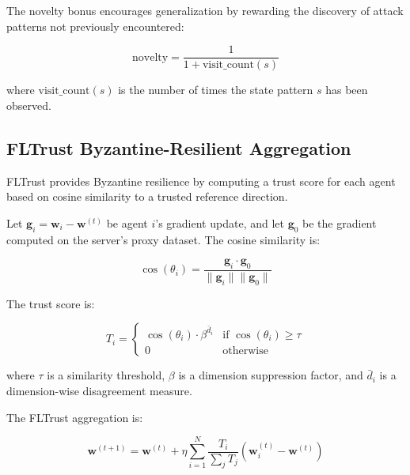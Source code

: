\documentclass[conference]{IEEEtran}
\begin{document}
The novelty bonus encourages generalization by rewarding the discovery of attack patterns not previously encountered:

\begin{equation}
\text{novelty} = \frac{1}{1 + \text{visit\_count}(s)}
\end{equation}

where $\text{visit\_count}(s)$ is the number of times the state pattern $s$ has been observed.

\subsection{FLTrust Byzantine-Resilient Aggregation}

FLTrust \cite{fltrust} provides Byzantine resilience by computing a trust score for each agent based on cosine similarity to a trusted reference direction.

Let $\mathbf{g}_i = \mathbf{w}_i - \mathbf{w}^{(t)}$ be agent $i$'s gradient update, and let $\mathbf{g}_0$ be the gradient computed on the server's proxy dataset. The cosine similarity is:

\begin{equation}
\cos(\theta_i) = \frac{\mathbf{g}_i \cdot \mathbf{g}_0}{\|\mathbf{g}_i\| \|\mathbf{g}_0\|}
\end{equation}

The trust score is:

\begin{equation}
T_i = \begin{cases}
\cos(\theta_i) \cdot \beta^{\bar{d}_i} & \text{if } \cos(\theta_i) \geq \tau \\
0 & \text{otherwise}
\end{cases}
\end{equation}

where $\tau$ is a similarity threshold, $\beta$ is a dimension suppression factor, and $\bar{d}_i$ is a dimension-wise disagreement measure.

The FLTrust aggregation is:

\begin{equation}
\mathbf{w}^{(t+1)} = \mathbf{w}^{(t)} + \eta \sum_{i=1}^{N} \frac{T_i}{\sum_j T_j} (\mathbf{w}_i^{(t)} - \mathbf{w}^{(t)})
\end{equation}
\end{document}
